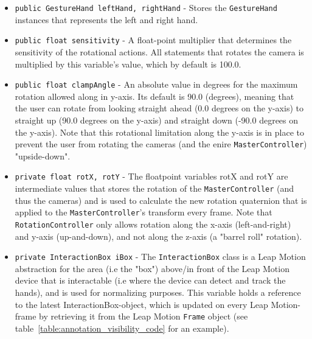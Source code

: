 \begin{itemize}
    \item \texttt{public GestureHand leftHand, rightHand} - Stores the \texttt{GestureHand} instances that represents the left and right hand.
    \item \texttt{public float sensitivity} - A float-point multiplier that determines the sensitivity of the rotational actions. 
                                              All statements that rotates the camera is multiplied by this variable's value, which by default is 100.0.
    \item \texttt{public float clampAngle} - An absolute value in degrees for the maximum rotation allowed along in y-axis. 
                                            Its default is 90.0 (degrees), meaning that the user can rotate from looking straight ahead (0.0 degrees on the y-axis) to 
                                            straight up (90.0 degrees on the y-axis) and straight down (-90.0 degrees on the y-axis). Note that this rotational 
                                            limitation along the y-axis is in place to prevent the user from rotating the cameras (and the enire \texttt{MasterController}) 
                                            "upside-down". %
    \item \texttt{private float rotX, rotY} - The floatpoint variables rotX and rotY are intermediate values that stores the rotation of the \texttt{MasterController} (and thus the
                                              cameras) and is used to calculate the new rotation quaternion that is applied to the \texttt{MasterController}'s transform 
                                              every frame. Note that \texttt{RotationController} only allows rotation
                                              along the x-axis (left-and-right) and y-axis (up-and-down), and not along the z-axis (a "barrel roll" rotation). 
    \item \texttt{private InteractionBox iBox} - The \texttt{InteractionBox} class is a Leap Motion abstraction for the area (i.e the "box") above/in front of 
                                                the Leap Motion device that is interactable (i.e where the device can detect and track the hands), 
                                                and is used for normalizing purposes. 
                                                This variable holds a reference to the latest InteractionBox-object, which is updated on every Leap Motion-frame by
                                                retrieving it from the Leap Motion \texttt{Frame} object (see table~\vref{table:annotation_visibility_code} for an example).  
\end{itemize}

